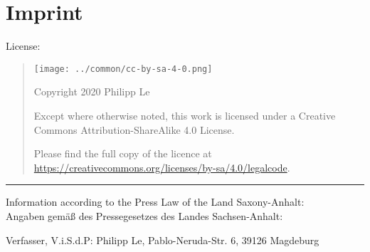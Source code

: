 %
%
%

\chapter*{Imprint}

{
\small

License:

\begin{quote}
	\texttt{[image: ../common/cc-by-sa-4-0.png]}
		
	Copyright \textcopyright{} 2020 Philipp Le
	
	Except where otherwise noted, this work is licensed under a
	Creative Commons Attribution-ShareAlike 4.0 License.
	
	Please find the full copy of the licence at \url{https://creativecommons.org/licenses/by-sa/4.0/legalcode}.
\end{quote}

\vspace{1.5em}

\hrule{}

\vspace{1.5em}

Information according to the Press Law of the Land Saxony-Anhalt:\\
Angaben gem\"a{}{\ss} des Pressegesetzes des Landes Sachsen-Anhalt:

Verfasser, V.i.S.d.P: Philipp Le, Pablo-Neruda-Str. 6, 39126 Magdeburg

}
